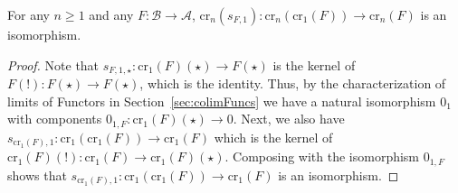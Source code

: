 \begin{lem}[label=lem:idempotCr1]
    For any $n \geq 1$ and any $F:\mathcal{B}\rightarrow \mathcal{A}$, $\text{cr}_n(s_{F,1}):\text{cr}_n(\text{cr}_1(F))\to \text{cr}_n(F)$ is an isomorphism.
\end{lem}
\begin{proof}
    Note that $s_{F,1,\star}:\text{cr}_1(F)(\star)\to F(\star)$ is the kernel of $F(!):F(\star)\to F(\star)$, which is the identity. Thus, by the characterization of limits of Functors in Section~\ref{sec:colimFuncs} we have a natural isomorphism $0_1$ with components $0_{1,F}:\text{cr}_1(F)(\star)\to 0$. Next, we also have $s_{\text{cr}_1(F),1}:\text{cr}_1(\text{cr}_1(F))\to \text{cr}_1(F)$ which is the kernel of $\text{cr}_1(F)(!):\text{cr}_1(F)\to \text{cr}_1(F)(\star)$. Composing with the isomorphism $0_{1,F}$ shows that $s_{\text{cr}_1(F),1}:\text{cr}_1(\text{cr}_1(F))\to \text{cr}_1(F)$ is an isomorphism.
    

    \vspace{10pt}


\end{proof}
